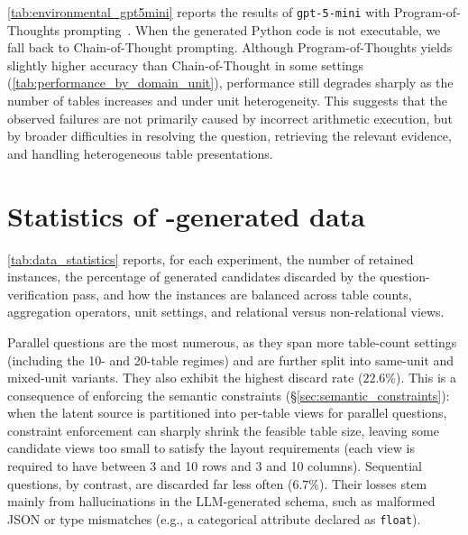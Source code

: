 
\autoref{tab:environmental_gpt5mini} reports the results of \texttt{gpt-5-mini} with Program-of-Thoughts prompting~\cite{pot}. When the generated Python code is not executable, we fall back to Chain-of-Thought prompting. Although Program-of-Thoughts yields slightly higher accuracy than Chain-of-Thought in some settings (\autoref{tab:performance_by_domain_unit}), performance still degrades sharply as the number of tables increases and under unit heterogeneity. This suggests that the observed failures are not primarily caused by incorrect arithmetic execution, but by broader difficulties in resolving the question, retrieving the relevant evidence, and handling heterogeneous table presentations.

\section{Statistics of \name-generated data}
\label{sec:data_statistics}

\autoref{tab:data_statistics} reports, for each experiment, the number of
retained instances, the percentage of generated candidates discarded by
the question-verification pass, and how the instances are balanced across
table counts, aggregation operators, unit settings, and relational versus non-relational views.

Parallel questions are the most numerous, as they span more table-count
settings (including the 10- and 20-table regimes) and are further split
into same-unit and mixed-unit variants. They also exhibit the highest
discard rate ($22.6\%$). This is a consequence of enforcing the semantic
constraints (\S\ref{sec:semantic_constraints}): when the latent source is
partitioned into per-table views for parallel questions, constraint
enforcement can sharply shrink the feasible table size, leaving some
candidate views too small to satisfy the layout requirements (each view is required to have between 3 and 10 rows and 3 and 10 columns). Sequential
questions, by contrast, are discarded far less often ($6.7\%$). Their
losses stem mainly from hallucinations in the LLM-generated schema, such as
malformed JSON or type mismatches (e.g., a categorical attribute declared
as \texttt{float}).

